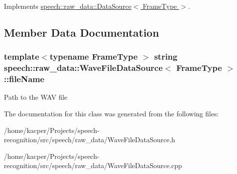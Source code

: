 Implements \hyperlink{classspeech_1_1raw__data_1_1DataSource_ab4d9cfbe2d556e6d587e25e4b3074d5f}{speech\+::raw\+\_\+data\+::\+Data\+Source$<$ Frame\+Type $>$}.



\subsection{Member Data Documentation}
\hypertarget{classspeech_1_1raw__data_1_1WaveFileDataSource_a28870da18426c9339b8f67eec21000be}{
\subsubsection[{file\+Name}]{\setlength{\rightskip}{0pt plus 5cm}template$<$typename Frame\+Type $>$ string {\bf speech\+::raw\+\_\+data\+::\+Wave\+File\+Data\+Source}$<$ Frame\+Type $>$\+::file\+Name\hspace{0.3cm}{\ttfamily [protected]}}}\label{classspeech_1_1raw__data_1_1WaveFileDataSource_a28870da18426c9339b8f67eec21000be}
Path to the W\+A\+V file 

The documentation for this class was generated from the following files\+:\begin{DoxyCompactItemize}
\item 
/home/kacper/\+Projects/speech-\/recognition/src/speech/raw\+\_\+data/Wave\+File\+Data\+Source.\+h\item 
/home/kacper/\+Projects/speech-\/recognition/src/speech/raw\+\_\+data/Wave\+File\+Data\+Source.\+cpp\end{DoxyCompactItemize}
